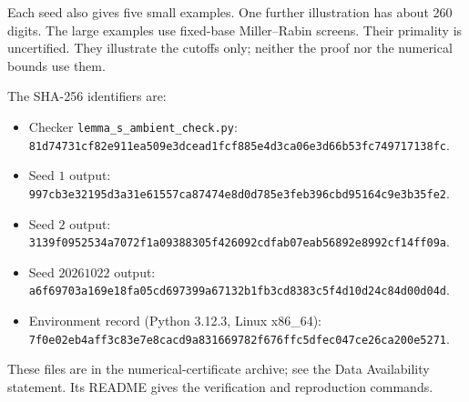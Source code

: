 Each seed also gives five small examples.
One further illustration has about 260 digits.
The large examples use fixed-base Miller--Rabin screens.
Their primality is uncertified.
They illustrate the cutoffs only;
neither the proof nor the numerical bounds use them.

The SHA-256 identifiers are:
\begin{itemize}[leftmargin=2em]
\item Checker \texttt{lemma\_s\_ambient\_check.py}:
  \texttt{81d74731\allowbreak{}cf82e911\allowbreak{}ea509e3d\allowbreak{}cead1fcf\allowbreak{}885e4d3c\allowbreak{}a06e3d66\allowbreak{}b53fc749\allowbreak{}717138fc}.
\item Seed $1$ output:
  \texttt{997cb3e3\allowbreak{}2195d3a3\allowbreak{}1e61557c\allowbreak{}a87474e8\allowbreak{}d0d785e3\allowbreak{}feb396cb\allowbreak{}d95164c9\allowbreak{}e3b35fe2}.
\item Seed $2$ output:
  \texttt{3139f095\allowbreak{}2534a707\allowbreak{}2f1a0938\allowbreak{}8305f426\allowbreak{}092cdfab\allowbreak{}07eab568\allowbreak{}92e8992c\allowbreak{}f14ff09a}.
\item Seed $20261022$ output:
  \texttt{a6f69703\allowbreak{}a169e18f\allowbreak{}a05cd697\allowbreak{}399a6713\allowbreak{}2b1fb3cd\allowbreak{}8383c5f4\allowbreak{}d10d24c8\allowbreak{}4d00d04d}.
\item Environment record (Python 3.12.3, Linux x86\_64):
  \texttt{7f0e02eb\allowbreak{}4aff3c83\allowbreak{}e7e8cacd\allowbreak{}9a831669\allowbreak{}782f676f\allowbreak{}fc5dfec0\allowbreak{}47ce26ca\allowbreak{}200e5271}.
\end{itemize}
These files are in the numerical-certificate archive;
see the Data Availability statement.
Its README gives the verification and reproduction commands.
